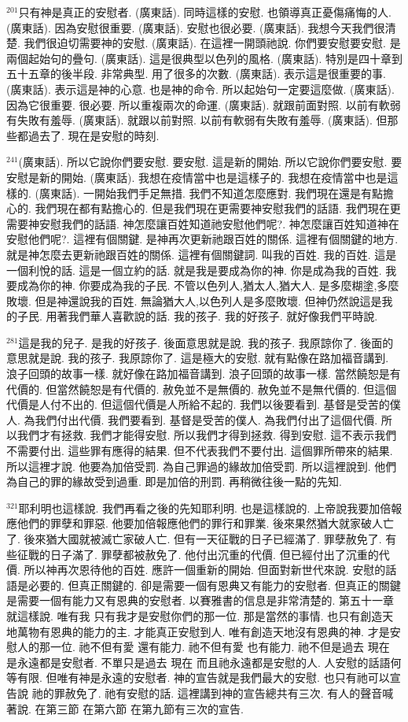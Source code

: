 \documentclass{book}
\begin{document}
$^{201}$只有神是真正的安慰者.
(廣東話).
同時這樣的安慰.
也領導真正憂傷痛悔的人.
(廣東話).
因為安慰很重要.
(廣東話).
安慰也很必要.
(廣東話).
我想今天我們很清楚.
我們很迫切需要神的安慰.
(廣東話).
在這裡一開頭祂說.
你們要安慰要安慰.
是兩個起始句的疊句.
(廣東話).
這是很典型以色列的風格.
(廣東話).
特別是四十章到五十五章的後半段.
非常典型.
用了很多的次數.
(廣東話).
表示這是很重要的事.
(廣東話).
表示這是神的心意.
也是神的命令.
所以起始句一定要這麼做.
(廣東話).
因為它很重要.
很必要.
所以重複兩次的命運.
(廣東話).
就跟前面對照.
以前有軟弱有失敗有羞辱.
(廣東話).
就跟以前對照.
以前有軟弱有失敗有羞辱.
(廣東話).
但那些都過去了.
現在是安慰的時刻.

$^{241}$(廣東話).
所以它說你們要安慰.
要安慰.
這是新的開始.
所以它說你們要安慰.
要安慰是新的開始.
(廣東話).
我想在疫情當中也是這樣子的.
我想在疫情當中也是這樣的.
(廣東話).
一開始我們手足無措.
我們不知道怎麼應對.
我們現在還是有點擔心的.
我們現在都有點擔心的.
但是我們現在更需要神安慰我們的話語.
我們現在更需要神安慰我們的話語.
神怎麼讓百姓知道祂安慰他們呢?.
神怎麼讓百姓知道神在安慰他們呢?.
這裡有個關鍵.
是神再次更新祂跟百姓的關係.
這裡有個關鍵的地方.
就是神怎麼去更新祂跟百姓的關係.
這裡有個關鍵詞.
叫我的百姓.
我的百姓.
這是一個利悅的話.
這是一個立約的話.
就是我是要成為你的神.
你是成為我的百姓.
我要成為你的神.
你要成為我的子民.
不管以色列人,猶太人,猶大人.
是多麼糊塗,多麼敗壞.
但是神還說我的百姓.
無論猶大人,以色列人是多麼敗壞.
但神仍然說這是我的子民.
用著我們華人喜歡說的話.
我的孩子.
我的好孩子.
就好像我們平時說.

$^{281}$這是我的兒子.
是我的好孩子.
後面意思就是說.
我的孩子.
我原諒你了.
後面的意思就是說.
我的孩子.
我原諒你了.
這是極大的安慰.
就有點像在路加福音講到.
浪子回頭的故事一樣.
就好像在路加福音講到.
浪子回頭的故事一樣.
當然饒恕是有代價的.
但當然饒恕是有代價的.
赦免並不是無價的.
赦免並不是無代價的.
但這個代價是人付不出的.
但這個代價是人所給不起的.
我們以後要看到.
基督是受苦的僕人.
為我們付出代價.
我們要看到.
基督是受苦的僕人.
為我們付出了這個代價.
所以我們才有拯救.
我們才能得安慰.
所以我們才得到拯救.
得到安慰.
這不表示我們不需要付出.
這些罪有應得的結果.
但不代表我們不要付出.
這個罪所帶來的結果.
所以這裡才說.
他要為加倍受罰.
為自己罪過的緣故加倍受罰.
所以這裡說到.
他們為自己的罪的緣故受到過重.
即是加倍的刑罰.
再稍微往後一點的先知.

$^{321}$耶利明也這樣說.
我們再看之後的先知耶利明.
也是這樣說的.
上帝說我要加倍報應他們的罪孽和罪惡.
他要加倍報應他們的罪行和罪業.
後來果然猶大就家破人亡了.
後來猶大國就被滅亡家破人亡.
但有一天征戰的日子已經滿了.
罪孽赦免了.
有些征戰的日子滿了.
罪孽都被赦免了.
他付出沉重的代價.
但已經付出了沉重的代價.
所以神再次恩待他的百姓.
應許一個重新的開始.
但面對新世代來說.
安慰的話語是必要的.
但真正關鍵的.
卻是需要一個有恩典又有能力的安慰者.
但真正的關鍵是需要一個有能力又有恩典的安慰者.
以賽雅書的信息是非常清楚的.
第五十一章就這樣說.
唯有我 只有我才是安慰你們的那一位.
那是當然的事情.
也只有創造天地萬物有恩典的能力的主.
才能真正安慰到人.
唯有創造天地沒有恩典的神.
才是安慰人的那一位.
祂不但有愛 還有能力.
祂不但有愛 也有能力.
祂不但是過去 現在 是永遠都是安慰者.
不單只是過去 現在 而且祂永遠都是安慰的人.
人安慰的話語何等有限.
但唯有神是永遠的安慰者.
神的宣告就是我們最大的安慰.
也只有祂可以宣告說 祂的罪赦免了.
祂有安慰的話.
這裡講到神的宣告總共有三次.
有人的聲音喊著說.
在第三節 在第六節 在第九節有三次的宣告.
\end{document}
